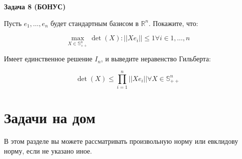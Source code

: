 \documentclass[
  russian,
  letterpaper,
  DIV=11,
  numbers=noendperiod]{scrartcl}
\begin{document}
\textbf{Задача 8 (БОНУС)}

Пусть \(e_1,\dots,e_n\) будет стандартным базисом в \(\mathbb{R}^{n}\).
Покажите, что:

\[ 
\max\limits_{X\in\mathbb{S}^{n}_{++}} {\det(X): ||Xe_i|| \leq 1 \forall i \in 1,\dots,n} 
\]

Имеет единственное решение \(I_n\), и выведите неравенство Гильберта:

\[ 
\det(X) \leq \prod\limits_{i=1}^{n} ||Xe_i|| \forall X \in \mathbb{S}^{n}_{++} 
\]

\section{Задачи на
дом}\label{ux437ux430ux434ux430ux447ux438-ux43dux430-ux434ux43eux43c}

В этом разделе вы можете рассматривать произвольную норму или евклидову
норму, если не указано иное.
\end{document}
